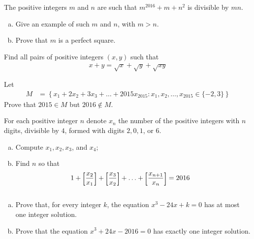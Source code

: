 \documentclass[problems.tex]{subfile}
\begin{document}
	\begin{problem}
		The positive integers $m$ and $n$ are such that $m^{2016}+m+n^2$ is divisible
		by $mn$.
		\begin{enumerate}[(a)]
			\item Give an example of such $m$ and $n$, with $m > n$.
			\item Prove that $m$ is a perfect square.
		\end{enumerate}
	\end{problem}

	\begin{problem}
		Find all pairs of positive integers $(x,y)$ such that
		\begin{align*}
			x + y = \sqrt x + \sqrt y + \sqrt{xy}
		\end{align*}
	\end{problem}

	\begin{problem}
		Let
		\begin{align*}
			M &= \left\{x_1 + 2x_2 + 3x_3 + \dots + 2015x_{2015} : x_1, x_2, \dots, 	x_{2015} \in \{-2, 3\}\right\}
		\end{align*}
		Prove that $2015 \in M$ but $2016 \not \in M$.
	\end{problem}

	\begin{problem}
		For each positive integer $n$ denote $x_n$ the number of the positive
		integers with $n$ digits, divisible by $4$, formed with digits $2, 0, 1$, or $6$.
		\begin{enumerate}[(a)]
			\item Compute $x_1, x_2, x_3$, and $x_4$;
			\item Find $n$ so that
			\begin{align*}
				1 + \floor{\frac{x_2}{x_1}}+ \floor{\frac{x_3}{x_2}}+ \ldots +\floor{\frac{x_{n+1}}{x_n}}
					& = 2016
			\end{align*}
		\end{enumerate}
	\end{problem}

	\begin{problem}
		$ $
		\begin{enumerate}[(a)]
			\item Prove that, for every integer $k$, the equation $x^3 - 24x + k = 0$ has at most one integer solution.
			\item Prove that the equation $x^3 + 24x - 2016 = 0$ has exactly one integer solution.
		\end{enumerate}
	\end{problem}
\end{document}
